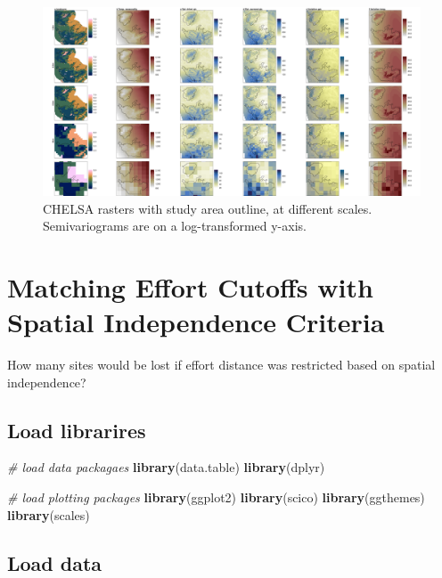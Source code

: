 \documentclass[]{article}
\newenvironment{Shaded}{\begin{snugshade}}{\end{snugshade}}
\newcommand{\CommentTok}[1]{\textcolor[rgb]{0.56,0.35,0.01}{\textit{#1}}}
\newcommand{\KeywordTok}[1]{\textcolor[rgb]{0.13,0.29,0.53}{\textbf{#1}}}
\newcommand{\NormalTok}[1]{#1}
\begin{document}
\begin{figure}
\centering
\includegraphics{figs/fig_chelsa_resamp.png}
\caption{CHELSA rasters with study area outline, at different scales. Semivariograms are on a log-transformed y-axis.}
\end{figure}

\hypertarget{matching-effort-cutoffs-with-spatial-independence-criteria}{%
\section{Matching Effort Cutoffs with Spatial Independence Criteria}\label{matching-effort-cutoffs-with-spatial-independence-criteria}}

How many sites would be lost if effort distance was restricted based on spatial independence?

\hypertarget{load-librarires}{%
\subsection{Load librarires}\label{load-librarires}}

\begin{Shaded}
\begin{Highlighting}[numbers=left,,]
\CommentTok{# load data packagaes}
\KeywordTok{library}\NormalTok{(data.table)}
\KeywordTok{library}\NormalTok{(dplyr)}

\CommentTok{# load plotting packages}
\KeywordTok{library}\NormalTok{(ggplot2)}
\KeywordTok{library}\NormalTok{(scico)}
\KeywordTok{library}\NormalTok{(ggthemes)}
\KeywordTok{library}\NormalTok{(scales)}
\end{Highlighting}
\end{Shaded}

\hypertarget{load-data}{%
\subsection{Load data}\label{load-data}}
\end{document}
